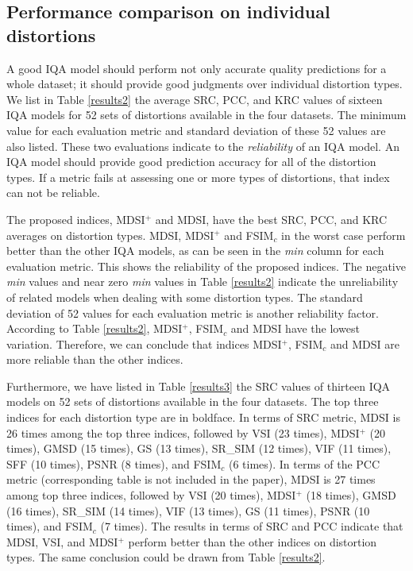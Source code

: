 \subsection{Performance comparison on individual distortions}
\label{individual}      

A good IQA model should perform not only accurate quality predictions for a whole dataset; it should provide good judgments over individual distortion types. We list in Table \ref{results2} the average SRC, PCC, and KRC values of sixteen IQA models for 52 sets of distortions available in the four datasets. The minimum value for each evaluation metric and standard deviation of these 52 values are also listed. These two evaluations indicate to the \textit{reliability} of an IQA model. An IQA model should provide good prediction accuracy for all of the distortion types. If a metric fails at assessing one or more types of distortions, that index can not be reliable.   

The proposed indices, MDSI$^+$ and MDSI, have the best SRC, PCC, and KRC averages on distortion types. MDSI, MDSI$^+$ and FSIM$_c$ in the worst case perform better than the other IQA models, as can be seen in the \textit{min} column for each evaluation metric. This shows the reliability of the proposed indices. The negative \textit{min} values and near zero \textit{min} values in Table \ref{results2} indicate the unreliability of related models when dealing with some distortion types. The standard deviation of 52 values for each evaluation metric is another reliability factor. According to Table \ref{results2}, MDSI$^+$, FSIM$_c$ and MDSI have the lowest variation. Therefore, we can conclude that indices MDSI$^+$, FSIM$_c$ and MDSI are more reliable than the other indices.   

Furthermore, we have listed in Table \ref{results3} the SRC values of thirteen IQA models on 52 sets of distortions available in the four datasets. The top three indices for each distortion type are in boldface. In terms of SRC metric, MDSI is 26 times among the top three indices, followed by VSI (23 times), MDSI$^+$ (20 times), GMSD (15 times), GS (13 times), SR\_SIM (12 times), VIF (11 times), SFF (10 times), PSNR (8 times), and FSIM$_c$ (6 times). In terms of the PCC metric (corresponding table is not included in the paper), MDSI is 27 times among top three indices, followed by VSI (20 times), MDSI$^+$ (18 times), GMSD (16 times), SR\_SIM (14 times), VIF (13 times), GS (11 times), PSNR (10 times), and FSIM$_c$ (7 times). The results in terms of SRC and PCC indicate that MDSI, VSI, and MDSI$^+$ perform better than the other indices on distortion types. The same conclusion could be drawn from Table \ref{results2}.       





